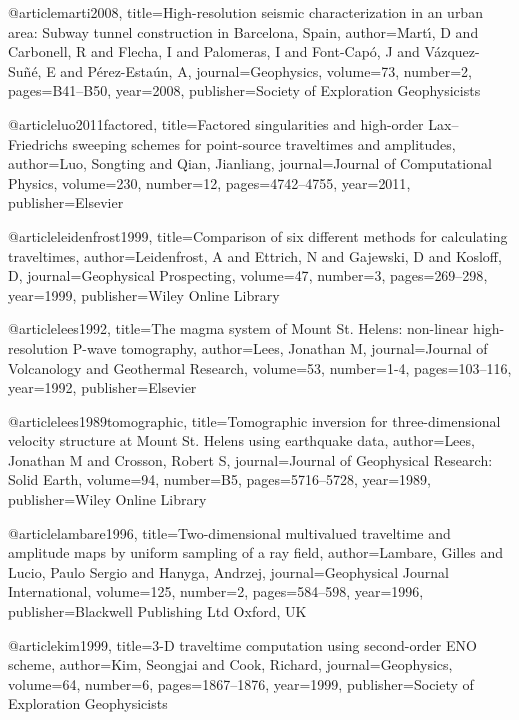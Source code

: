 @article{marti2008,
  title={High-resolution seismic characterization in an urban area: Subway tunnel construction in Barcelona, Spain},
  author={Mart{\'\i}, D and Carbonell, R and Flecha, I and Palomeras, I and Font-Cap{\'o}, J and V{\'a}zquez-Su{\~n}{\'e}, E and P{\'e}rez-Esta{\'u}n, A},
  journal={Geophysics},
  volume={73},
  number={2},
  pages={B41--B50},
  year={2008},
  publisher={Society of Exploration Geophysicists}
}

@article{luo2011factored,
  title={Factored singularities and high-order Lax--Friedrichs sweeping schemes for point-source traveltimes and amplitudes},
  author={Luo, Songting and Qian, Jianliang},
  journal={Journal of Computational Physics},
  volume={230},
  number={12},
  pages={4742--4755},
  year={2011},
  publisher={Elsevier}
}



@article{leidenfrost1999,
  title={Comparison of six different methods for calculating traveltimes},
  author={Leidenfrost, A and Ettrich, N and Gajewski, D and Kosloff, D},
  journal={Geophysical Prospecting},
  volume={47},
  number={3},
  pages={269--298},
  year={1999},
  publisher={Wiley Online Library}
}


@article{lees1992,
  title={The magma system of Mount St. Helens: non-linear high-resolution P-wave tomography},
  author={Lees, Jonathan M},
  journal={Journal of Volcanology and Geothermal Research},
  volume={53},
  number={1-4},
  pages={103--116},
  year={1992},
  publisher={Elsevier}
}

@article{lees1989tomographic,
  title={Tomographic inversion for three-dimensional velocity structure at Mount St. Helens using earthquake data},
  author={Lees, Jonathan M and Crosson, Robert S},
  journal={Journal of Geophysical Research: Solid Earth},
  volume={94},
  number={B5},
  pages={5716--5728},
  year={1989},
  publisher={Wiley Online Library}
}

@article{lambare1996,
  title={Two-dimensional multivalued traveltime and amplitude maps by uniform sampling of a ray field},
  author={Lambare, Gilles and Lucio, Paulo Sergio and Hanyga, Andrzej},
  journal={Geophysical Journal International},
  volume={125},
  number={2},
  pages={584--598},
  year={1996},
  publisher={Blackwell Publishing Ltd Oxford, UK}
}

@article{kim1999,
  title={3-D traveltime computation using second-order ENO scheme},
  author={Kim, Seongjai and Cook, Richard},
  journal={Geophysics},
  volume={64},
  number={6},
  pages={1867--1876},
  year={1999},
  publisher={Society of Exploration Geophysicists}
}


